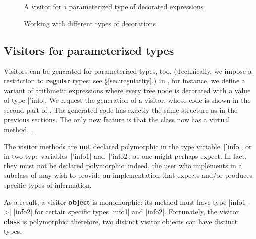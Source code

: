 \documentclass[11pt,a4paper,twoside]{article}
\renewcommand{\emph}[1]{\textbf{#1}}
\begin{document}

\begin{figure}[p]
\vspace{-\baselineskip}
\caption{A visitor for a parameterized type of decorated expressions}
\label{fig:expr09}
\end{figure}

\begin{figure}[p]
\caption{Working with different types of decorations}
\label{fig:expr10}
\end{figure}

\subsection{Visitors for parameterized types}
\label{sec:intro:parameterized}

Visitors can be generated for parameterized types, too. (Technically, we
impose a restriction to \emph{regular} types; see \S\ref{sec:regularity}.)
%
In , for instance, we define a variant of arithmetic
expressions where every tree node is decorated with a value of type
\oc|'info|. We request the generation of a \map visitor, whose code is shown
in the second part of . The generated code has exactly the
same structure as in the previous sections. The only new feature is that the
class \map now has a virtual method, .



The visitor methods are \emph{not} declared polymorphic in the type
variable~\oc|'info|, or in two type variables~\oc|'info1| and~\oc|'info2|, as
one might perhaps expect. In fact, they must not be declared polymorphic:
indeed, the user who implements  in a subclass of \map may
wish to provide an implementation that expects and/or produces specific types
of information.

As a result, a visitor \emph{object} is monomorphic: its method
 must have type \oc|info1 ->| \oc|info2| for certain specific
types \oc|info1| and \oc|info2|. Fortunately, the visitor \emph{class} is
polymorphic: therefore, two distinct visitor objects can have distinct types.
\end{document}
